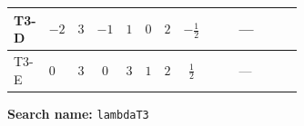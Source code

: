 \documentclass[8pt]{article}
\begin{document}
\begin{landscape}
\begin{longtable}{@{}llcccccc >{\raggedright\arraybackslash}p{0.21\linewidth} >{\raggedright\arraybackslash}p{0.21\linewidth} >{\raggedright\arraybackslash}p{0.21\linewidth}@{}}
\midrule
T3-D & $-2$ & $3$ & $-1$ & $1$ & $0$ & $2$ & $-\frac{1}{2}$ & \scriptsize\adjustbox{max width=\linewidth}{$\begin{gathered} +4 {\lambda_{H2}} {\lambda_{T3}}\end{gathered}$} & --- & \scriptsize\adjustbox{max width=\linewidth}{$\begin{gathered} -\frac{21 {g_2}^2 {\lambda_{T3}}}{2}\end{gathered}$} \\
\midrule
T3-E & $0$ & $3$ & $0$ & $3$ & $1$ & $2$ & $\frac{1}{2}$ & \scriptsize\adjustbox{max width=\linewidth}{$\begin{gathered} +4 {\lambda_{H2}} {\lambda_{T3}}\end{gathered}$} & --- & \scriptsize\adjustbox{max width=\linewidth}{$\begin{gathered} -\frac{33 {g_2}^2 {\lambda_{T3}}}{2}\end{gathered}$} \\
\midrule
\bottomrule
\end{longtable}
\clearpage
\noindent\textbf{Search name: }\texttt{lambdaT3}\par\smallskip

\end{landscape}
\end{document}
